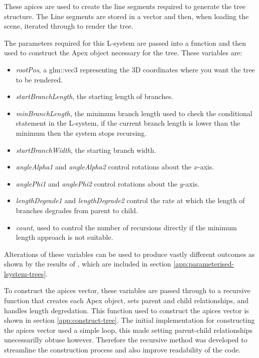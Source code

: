 \documentclass[final]{cmpreport}
\begin{document}
These apices are used to create the line segments required to generate the tree structure. The 
Line segments are stored in a vector and then, when loading the scene, iterated through to render the tree.

The parameters required for this L-system are passed into a function and then used to construct 
the Apex object necessary for the tree. These variables are:

\begin{itemize}
    \item \emph{rootPos}, a glm::vec3 representing the 3D coordinates where you want the tree to be rendered.
    \item \emph{startBranchLength}, the starting length of branches.
    \item \emph{minBranchLength}, the minimum branch length used to check the conditional statement in the 
          L-system, if the current branch length is lower than the minimum then the system stops recursing.
    \item \emph{startBranchWidth}, the starting branch width.
    \item \emph{angleAlpha1} and \emph{angleAlpha2} control rotations about the $x$-axis.
    \item \emph{anglePhi1} and \emph{anglePhi2} control rotations about the $y$-axis.
    \item \emph{lengthDegrade1} and \emph{lengthDegrade2} control the rate at which the length of branches 
          degrades from parent to child.
    \item \emph{count}, used to control the number of recursions directly if the minimum length approach 
          is not suitable.
\end{itemize}

Alterations of these variables can be used to produce vastly different outcomes as shown by the 
results of \cite{prusinkiewicz1996systems}, which are included in section \ref{app:parameterised-lsystem-trees}.

To construct the apices vector, these variables are passed through to a recursive function that 
creates each Apex object, sets parent and child relationships, and handles length degredation.
This function used to construct the apices vector is shown in section \ref{app:construct-tree}. 
The initial implementation for constructing the apices vector used a simple loop, this made 
setting parent-child relationships unecessarilly obtuse however. Therefore the recursive method 
was developed to streamline the construction process and also improve readability of the code.
\end{document}

